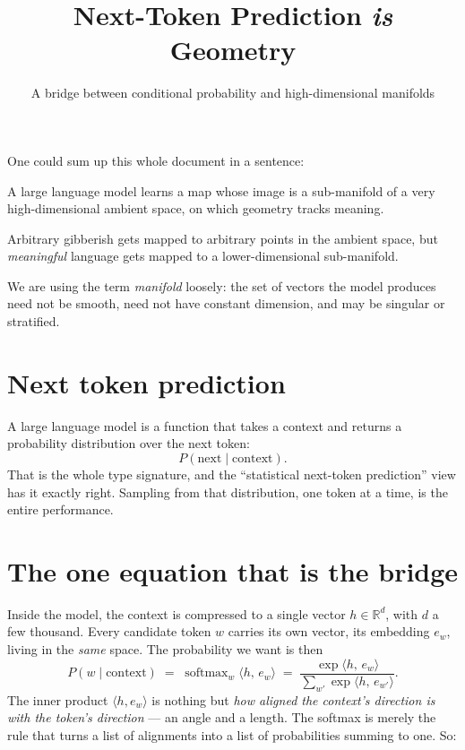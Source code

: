 \documentclass[11pt]{article}
\title{\color{inkblue}\bfseries Next-Token Prediction \textit{is} Geometry}
\author{A bridge between conditional probability and high-dimensional manifolds}
\date{}
\begin{document}
\maketitle
\thispagestyle{empty}

One could sum up this whole document in a sentence:
\begin{tcolorbox}[colback=yellow!18, colframe=yellow!55!black, arc=2pt, boxrule=0.5pt,
  left=10pt, right=10pt, top=8pt, bottom=8pt]
A large language model learns a map whose image is a sub-manifold of a very
high-dimensional ambient space, on which geometry tracks meaning.
\end{tcolorbox}
Arbitrary gibberish gets mapped to arbitrary points in the ambient space, but
\emph{meaningful} language gets mapped to a lower-dimensional sub-manifold.

We are using the term \emph{manifold} loosely: the set of
vectors the model produces need not be smooth, need not have constant dimension, and may be
singular or stratified.

\section{Next token prediction}

A large language model is a function that takes a context and returns a probability
distribution over the next token:
\[
  P(\text{next} \mid \text{context}).
\]
That is the whole type signature, and the ``statistical next-token prediction'' view
has it exactly right. Sampling from that distribution, one token at a time, is the
entire performance.

\section{The one equation that is the bridge}

Inside the model, the context is compressed to a single vector $h \in \mathbb{R}^d$,
with $d$ a few thousand. Every candidate token $w$ carries its own vector, its embedding
$e_w$, living in the \emph{same} space. The probability we want is then
\[
  P(w \mid \text{context})
  \;=\; \operatorname{softmax}_w \langle h,\, e_w \rangle
  \;=\; \frac{\exp\langle h,\, e_w\rangle}{\displaystyle\sum_{w'} \exp\langle h,\, e_{w'}\rangle}.
\]
The inner product $\langle h, e_w\rangle$ is nothing but \emph{how aligned the context's
direction is with the token's direction} --- an angle and a length. The softmax is
merely the rule that turns a list of alignments into a list of probabilities summing to
one. So:
\end{document}
